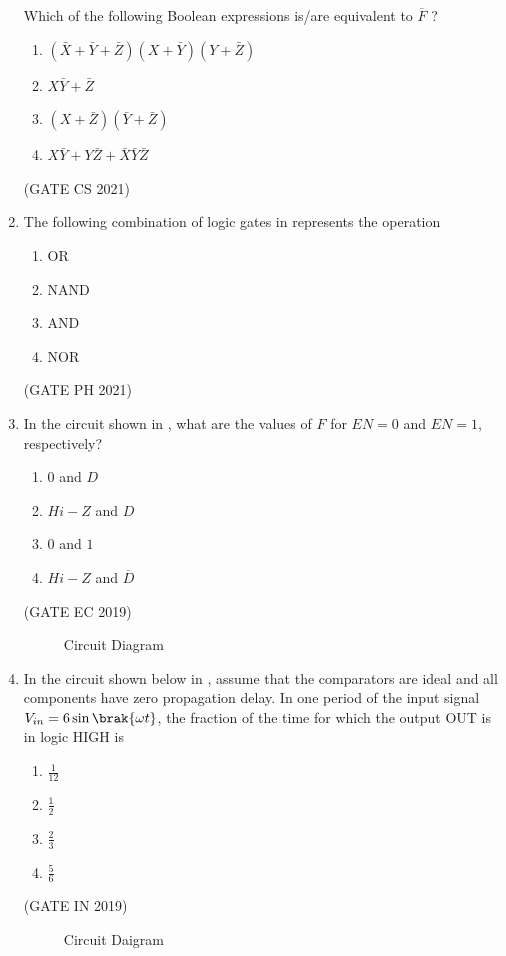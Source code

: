 \begin{enumerate}[label=\arabic*.,ref=\theenumi]
%       
Which of the following Boolean expressions is/are equivalent to $\overline{F}$ ?
% 
\begin{enumerate}                                     
\item $(\bar{X}+\bar{Y}+\bar{Z})(X+\bar{Y})(Y+\bar{Z})$
\item $X\bar{Y}+\bar{Z}$
\item $(X+\bar{Z})(\bar{Y}+\bar{Z})$
\item $X\bar{Y}+Y\bar{Z}+\bar{X}\bar{Y}\bar{Z}$ 
\end{enumerate}
\hfill{(GATE CS 2021)}
\item  The following combination of logic gates
in
	represents the operation
	\begin{enumerate}
       \item OR
       \item NAND
       \item AND
       \item NOR
   \end{enumerate}
%
 \hfill(GATE PH 2021)
	      \begin{figure}[H]
		      \centering
		      \resizebox{0.25\columnwidth}{!}{%
		      
		      }
	              \caption{}
		      \label{fig:GATE PH 2021}
	      \end{figure}
%
\item In the circuit shown
	in ,
	what are the values of $F$ for $EN=0$ and $EN=1$,  respectively?
\begin{enumerate}
    \item $0$ and $D$
    \item $Hi-Z$ and $D$
    \item $0$ and $1$
    \item $Hi-Z$ and $\overline{D}$
\end{enumerate}
 \hfill(GATE EC 2019)  
%
\begin{figure}[H]
    \centering
    \resizebox{0.5\columnwidth}{!}{%
    
	}
    \caption{Circuit Diagram}
	\label{fig:GATE-EC2019,14} 
\end{figure}
\item In the circuit shown below in 
	    ,
	 assume that the comparators are ideal and all components have zero propagation delay. In one period of the input signal $V_{in}=6\sin\brak{\omega t}$, the fraction of the time for which the output OUT is in logic HIGH is 
\begin{enumerate}[itemsep=1ex]
	\item $\frac{1}{12}$
	\item $\frac{1}{2}$
	\item $\frac{2}{3}$
	\item $\frac{5}{6}$
\end{enumerate}
		                 \hfill(GATE IN 2019)
\begin{figure}[H]
\centering
\resizebox{0.75\columnwidth}{!}{%
    
	}
	    \caption{Circuit Daigram}
	    \label{fig:GATE-IN2019,34}
     \end{figure}



\end{enumerate}
